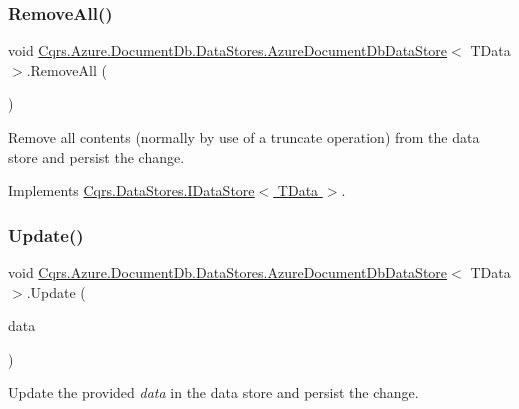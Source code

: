\subsubsection{\texorpdfstring{Remove\+All()}{RemoveAll()}}
{\footnotesize\ttfamily void \hyperlink{classCqrs_1_1Azure_1_1DocumentDb_1_1DataStores_1_1AzureDocumentDbDataStore}{Cqrs.\+Azure.\+Document\+Db.\+Data\+Stores.\+Azure\+Document\+Db\+Data\+Store}$<$ T\+Data $>$.Remove\+All (\begin{DoxyParamCaption}{ }\end{DoxyParamCaption})}



Remove all contents (normally by use of a truncate operation) from the data store and persist the change. 



Implements \hyperlink{interfaceCqrs_1_1DataStores_1_1IDataStore_aead8d7a39a717d29af05daf7b64bea94_aead8d7a39a717d29af05daf7b64bea94}{Cqrs.\+Data\+Stores.\+I\+Data\+Store$<$ T\+Data $>$}.

\mbox{\label{classCqrs_1_1Azure_1_1DocumentDb_1_1DataStores_1_1AzureDocumentDbDataStore_a55f504ed5094e3041a266b958424b1a2_a55f504ed5094e3041a266b958424b1a2}} 
\subsubsection{\texorpdfstring{Update()}{Update()}}
{\footnotesize\ttfamily void \hyperlink{classCqrs_1_1Azure_1_1DocumentDb_1_1DataStores_1_1AzureDocumentDbDataStore}{Cqrs.\+Azure.\+Document\+Db.\+Data\+Stores.\+Azure\+Document\+Db\+Data\+Store}$<$ T\+Data $>$.Update (\begin{DoxyParamCaption}\item[{T\+Data}]{data }\end{DoxyParamCaption})}



Update the provided {\itshape data}  in the data store and persist the change. 



